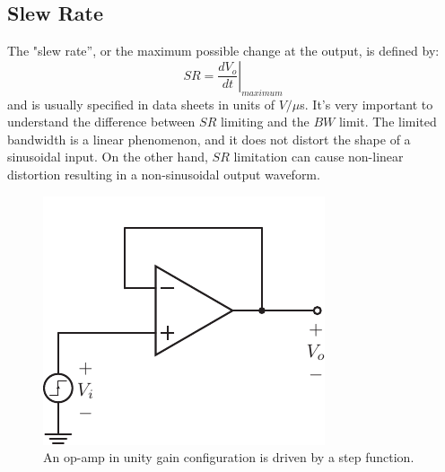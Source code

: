 \subsection{Slew Rate}
The "slew rate'', or the maximum possible change at the output, is defined by:
    \begin{equation}
        SR = \left. \frac{dV_o}{dt} \right|_{maximum}
    \end{equation}
and is usually specified in data sheets in units of $V/\mu$s.  It's very important to understand the difference between $SR$ limiting and the $BW$ limit.  The limited bandwidth is a linear phenomenon, and it does not distort the shape of a sinusoidal input.  On the other hand, $SR$ limitation can cause non-linear distortion resulting in a non-sinusoidal output waveform.
\begin{figure}[tb]
\centering
\includegraphics[scale=1]{opamp_unitygain_step}
\caption{An op-amp in unity gain configuration is driven by a step function.}
\label{fig:opamp_unitygain_step_fig}
\end{figure}
